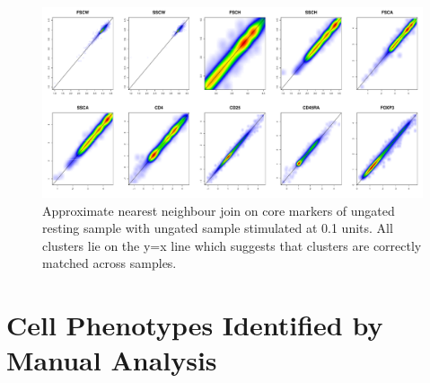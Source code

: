 \hspace{-2cm}
\begin{figure}[h]
\centering
\includegraphics[scale=.3]{IL2/figures/ann-join-0U-01U.pdf}
{Approximate nearest neighbour join on core markers of ungated resting sample with ungated sample stimulated at 0.1 units. }
{
All clusters lie on the y=x line which suggests that clusters are correctly matched across samples.
}
\end{figure}



\section{Cell Phenotypes Identified by Manual Analysis}


